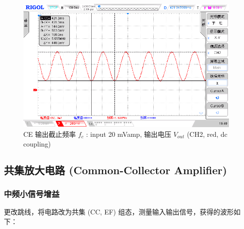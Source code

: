 \documentclass[UTF8]{article}
\begin{document}
\begin{figure}[H]\centering
    \includegraphics[width=\columnwidth]{LCE-02-三极管/assets/3dB 截止频率.png}
    \caption{CE 输出截止频率 $f_c$ :  input 20 mVamp, 输出电压 $V_{out}$ (CH2, red, dc coupling)}
\end{figure}

\subsection{共集放大电路 (Common-Collector Amplifier)}

\subsubsection{中频小信号增益}

更改跳线，将电路改为共集 (CC, EF) 组态，测量输入输出信号，获得的波形如下：
\end{document}
